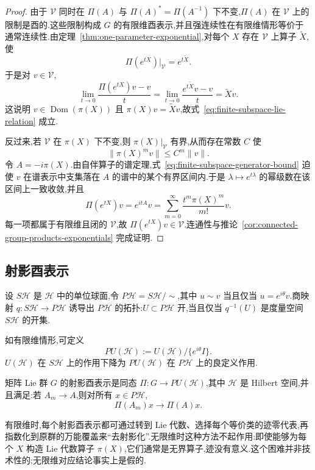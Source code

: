 {\begin{proof}
由于 $\mathcal V$ 同时在 $\Pi(A)$ 与 $\Pi(A)^*=\Pi(A^{-1})$ 下不变,$\Pi(A)$ 在 $\mathcal V$ 上的限制是酉的.这些限制构成 $G$ 的有限维酉表示,并且强连续性在有限维情形等价于通常连续性.由定理~\ref{thm:one-parameter-exponential},对每个 $X$ 存在 $\mathcal V$ 上算子 $\widetilde X$,使
\[
\Pi(e^{tX})|_{\mathcal V}=e^{t\widetilde X}.
\]
于是对 $v\in\mathcal V$,
\[
\lim_{t\to0}\frac{\Pi(e^{tX})v-v}{t}
=\lim_{t\to0}\frac{e^{t\widetilde X}v-v}{t}=\widetilde Xv.
\]
这说明 $v\in\operatorname{Dom}(\pi(X))$ 且 $\pi(X)v=\widetilde Xv$,故式~\eqref{eq:finite-subspace-lie-relation} 成立.

反过来,若 $\mathcal V$ 在 $\pi(X)$ 下不变,则 $\pi(X)|_{\mathcal V}$ 有界,从而存在常数 $C$ 使
\[
\|\pi(X)^m v\|\leq C^m\|v\|.
\label{eq:finite-subspace-generator-bound}
\]
令 $A=-i\pi(X)$.由自伴算子的谱定理,式~\eqref{eq:finite-subspace-generator-bound} 迫使 $v$ 在谱表示中支集落在 $A$ 的谱中的某个有界区间内.于是 $\lambda\mapsto e^{t\lambda}$ 的幂级数在该区间上一致收敛,并且
\[
\Pi(e^{tX})v=e^{itA}v=\sum_{m=0}^{\infty}\frac{t^m\pi(X)^m}{m!}v.
\]
每一项都属于有限维且闭的 $\mathcal V$,故 $\Pi(e^{tX})v\in\mathcal V$.连通性与推论~\ref{cor:connected-group-products-exponentials} 完成证明.
\end{proof}

\subsection{射影酉表示}
\label{subsec:infinite-dimensional-projective-representations}

设 $S\mathcal H$ 是 $\mathcal H$ 中的单位球面,令 $P\mathcal H=S\mathcal H/\sim$,其中 $u\sim v$ 当且仅当 $u=e^{i\theta}v$.商映射 $q:S\mathcal H\to P\mathcal H$ 诱导出 $P\mathcal H$ 的拓扑:$U\subset P\mathcal H$ 开,当且仅当 $q^{-1}(U)$ 是度量空间 $S\mathcal H$ 的开集.

如有限维情形,可定义
\[
PU(\mathcal H):=U(\mathcal H)/\{e^{i\theta}I\}.
\]
$U(\mathcal H)$ 在 $S\mathcal H$ 上的作用下降为 $PU(\mathcal H)$ 在 $P\mathcal H$ 上的良定义作用.

\begin{definition}[无限维射影酉表示]\label{def:infinite-dimensional-projective-representation}
矩阵 Lie 群 $G$ 的射影酉表示是同态 $\Pi:G\to PU(\mathcal H)$,其中 $\mathcal H$ 是 Hilbert 空间,并且满足:若 $A_m\to A$,则对所有 $x\in P\mathcal H$,
\[
\Pi(A_m)x\to\Pi(A)x.
\]
\end{definition}

有限维时,每个射影酉表示都可通过转到 Lie 代数、选择每个等价类的迹零代表,再指数化到原群的万能覆盖来“去射影化”.无限维时这种方法不起作用:即使能够为每个 $X$ 构造 Lie 代数算子 $\pi(X)$,它们通常是无界算子,迹没有意义.这个困难并非技术性的;无限维对应结论事实上是假的.

}
